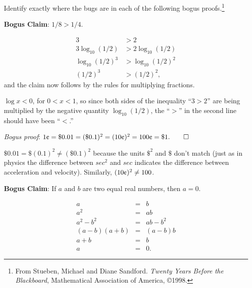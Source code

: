\documentclass[handout]{mcs}
\begin{document}


\begin{problem}



Identify exactly where the bugs are in each of the following bogus
proofs.\footnote{From Stueben, Michael and Diane Sandford. \emph{Twenty
Years Before the Blackboard}, Mathematical Association of America, \copyright 1998.}

\bparts

\problempart \textbf{Bogus Claim}: $1/8 > 1/4.$
\begin{bogusproof}
\begin{align*}
    3 &> 2 \\
    3 \log_{10} (1/2) &> 2 \log_{10}(1/2) \\
    \log_{10} (1/2)^3 &> \log_{10} (1/2)^2 \\
    (1/2)^3 &> (1/2)^2,
\end{align*}
and the claim now follows by the rules for multiplying fractions.
\end{bogusproof}

\begin{solution}
$\log x < 0$, for $0<x<1$, so since both sides of the inequality
``$3 > 2$'' are being multiplied by the negative quantity
$\log_{10}(1/2)$, the ``$>$'' in the second line should have been
``$<$.''
\end{solution}

\ppart \emph{Bogus proof}: $1 \mbox{\textcent} = \$0.01 = (\$0.1)^2 = (10\mbox{\textcent})^2 =
100\mbox{\textcent} = \$1.\qed$

\begin{solution}
$\$0.01 = \$(0.1)^2 \neq (\$0.1)^2$ because the units $\$^2$ and
$\$$ don't match (just as in physics the difference between $sec^2$ and
$sec$ indicates the difference between acceleration and velocity).
Similarly, $(10\mbox{\textcent})^2 \neq 100$\textcent.
\end{solution}


\ppart \textbf{Bogus Claim}: If $a$ and $b$ are two equal real numbers,
then $a=0$.
\begin{bogusproof}
\begin{eqnarray*}
a&=&b \\
a^2&=&ab \\
a^2-b^2&=&ab-b^2 \\
(a-b)(a+b)&=&(a-b)b\\ %
a+b&=&b\\ %
a&=&0.
\end{eqnarray*}
\end{bogusproof}


\end{problem}
\end{document}
